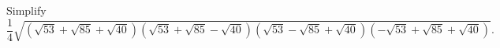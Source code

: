 Simplify
\[
\dfrac{1}{4}\sqrt{\left(\sqrt{53}+\sqrt{85}+\sqrt{40}\right)\left(\sqrt{53}+\sqrt{85}-\sqrt{40}\right)\left(\sqrt{53}-\sqrt{85}+\sqrt{40}\right)\left(-\sqrt{53}+\sqrt{85}+\sqrt{40}\right)} .
\]
